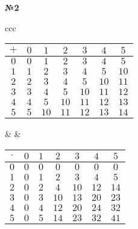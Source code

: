 \documentclass{article}
\newenvironment{task}{\begin{center}\fontsize{14}{14}\selectfont\bf}{\rm\fontsize{12}{12}\selectfont\end{center}}
\begin{document}
	\begin{task} 
		№2
	\end{task}
	\begin{center}
	\begin{tabular}{ccc}
		\begin{tabular}{|c||c|c|c|c|c|c|} \hline
			$+$	& $0$   & $1$	& $2$	& $3$	& $4$	& $5$	 \\ \hline \hline
			$0$	& $0$	& $1$	& $2$	& $3$	& $4$	& $5$	 \\ \hline
			$1$	& $1$	& $2$	& $3$	& $4$	& $5$	& $10$	 \\ \hline
			$2$	& $2$	& $3$	& $4$	& $5$	& $10$	& $11$	 \\ \hline
			$3$	& $3$	& $4$	& $5$	& $10$	& $11$	& $12$	 \\ \hline
			$4$	& $4$	& $5$	& $10$	& $11$	& $12$	& $13$	 \\ \hline
			$5$	& $5$	& $10$	& $11$	& $12$	& $13$	& $14$	 \\ \hline
		\end{tabular}
	& \hfill &
		\begin{tabular}{|c||c|c|c|c|c|c|} \hline
			$\cdot$	& $0$   & $1$	& $2$	& $3$	& $4$	& $5$	 \\ \hline \hline
			$0$		& $0$	& $0$	& $0$	& $0$	& $0$	& $0$	 \\ \hline
			$1$		& $0$	& $1$	& $2$	& $3$	& $4$	& $5$	 \\ \hline
			$2$		& $0$	& $2$	& $4$	& $10$	& $12$	& $14$	 \\ \hline
			$3$		& $0$	& $3$	& $10$	& $13$	& $20$	& $23$	 \\ \hline
			$4$		& $0$	& $4$	& $12$	& $20$	& $24$	& $32$	 \\ \hline
			$5$		& $0$	& $5$	& $14$	& $23$	& $32$	& $41$	 \\ \hline
		\end{tabular} \\
	\end{tabular} \\
	\end{center}
	
\end{document}
